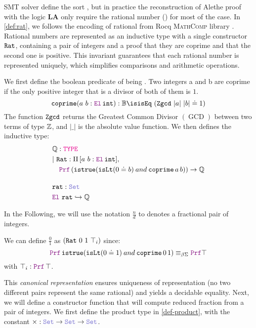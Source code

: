 
SMT solver define the sort , but in practice the reconstruction of Alethe proof with the logic \textbf{LA} only require the rational number (\Q) for most of the case.
In \cref{def:rat}, we follows the encoding of rational from Rocq \cite{Rocq-refman} \textsc{MathComp} library \cite{mathcomp}.
Rational numbers are represented as an inductive type with a single constructor $\texttt{\upshape{Rat}}$, containing a pair of integers and a proof that they are coprime and that the second one is positive.
This invariant guarantees that each rational number is represented uniquely, which simplifies comparisons and arithmetic operations.

\begin{definition}[Rational]\label{def:rat}
We first define the boolean predicate of being . Two integers a and b are coprime if the only positive integer that is a divisor of both of them is $1$.
\begin{equation*}
\kw{coprime} (a~b: \el\,\kw{int}): \B \is  \kw{isEq}~(\kw{Zgcd}~|a|~|b| \doteq 1)
\end{equation*}
The function $\texttt{\upshape{Zgcd}}$ returns the Greatest Common Divisor $(\mathop{GCD})$ between two terms of type $\mathbb{Z}$, and $|\_|$ is the absolute value function.
We then defines the inductive type:
\begin{align*}
& \Q: \type \\
& |~\kw{Rat}: \Pi\,[a~b: \el\,\kw{int}],\\
& \quad \prf\, (\kw{istrue} (\kw{isLt} (0 \doteq b) \mathbin{and} \kw{coprime}\,a\,b)) \ra \Q \\[1em]
&\kw{rat}: \set{} \\
&\el~\kw{rat} \re \Q
\end{align*}
\end{definition}

In the Following, we will use the notation $\frac{n}{d}$ to denotes a fractional pair of integers.


\begin{example}
We can define $\frac{0}{1}$ as $(\texttt{\upshape{Rat}}~0~1~\top_i)$ since:
\[
\prf\, \kw{istrue} (\kw{isLt} (0 \doteq 1) \mathbin{and} \kw{coprime}\,0\,1) \equivL \prf \top 
\]
with $\top_i : \prf\,\top$.
\end{example}

This \emph{canonical representation} ensures uniqueness of representation (no two different pairs represent the same rational) and yields a decidable equality.
Next, we will define a constructor function that will compute reduced fraction from a pair of integers.
We first define the product type in \cref{def-product}, with the constant $\times: \set \ra \set \ra \set$.

